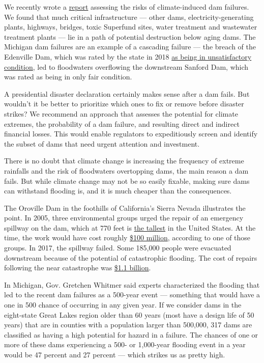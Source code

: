 We recently wrote a
\href{http://water.columbia.edu/files/2020/05/GRI_Report.pdf}{report}
assessing the risks of climate-induced dam failures. We found that much
critical infrastructure --- other dams, electricity-generating plants,
highways, bridges, toxic Superfund sites, water treatment and wastewater
treatment plants --- lie in a path of potential destruction below aging
dams. The Michigan dam failures are an example of a cascading failure
--- the breach of the Edenville Dam, which was rated by the state in
2018
\href{https://www.nytimes3xbfgragh.onion/aponline/2020/05/20/us/ap-us-midwest-flooding.html}{as
being in unsatisfactory condition}, led to floodwaters overflowing the
downstream Sanford Dam, which was rated as being in only fair condition.

A presidential disaster declaration certainly makes sense after a dam
fails. But wouldn't it be better to prioritize which ones to fix or
remove before disaster strikes? We recommend an approach that assesses
the potential for climate extremes, the probability of a dam failure,
and resulting direct and indirect financial losses. This would enable
regulators to expeditiously screen and identify the subset of dams that
need urgent attention and investment.

There is no doubt that climate change is increasing the frequency of
extreme rainfalls and the risk of floodwaters overtopping dams, the main
reason a dam fails. But while climate change may not be so easily
fixable, making sure dams can withstand flooding is, and it is much
cheaper than the consequences.

The Oroville Dam in the foothills of California's Sierra Nevada
illustrates the point. In 2005, three environmental groups urged the
repair of an emergency spillway on the dam, which at 770 feet is
\href{https://www.worldatlas.com/articles/tallest-dams-in-the-united-states.html}{the
tallest} in the United States. At the time, the work would have cost
roughly
\href{https://www.washingtonpost.com/news/post-nation/wp/2017/02/13/officials-were-warned-the-oroville-dam-emergency-spillway-wasnt-safe-they-didnt-listen/}{\$100
million}, according to one of those groups. In 2017, the spillway
failed. Some 185,000 people were evacuated downstream because of the
potential of catastrophic flooding. The cost of repairs following the
near catastrophe was
\href{https://www.latimes.com/local/california/la-me-oroville-cost-20180905-story.html}{\$1.1
billion}.

In Michigan, Gov. Gretchen Whitmer said experts characterized the
flooding that led to the recent dam failures as a 500-year event ---
something that would have a one in 500 chance of occurring in any given
year. If we consider dams in the eight-state Great Lakes region older
than 60 years (most have a design life of 50 years) that are in counties
with a population larger than 500,000, 317 dams are classified as having
a high potential for hazard in a failure. The chances of one or more of
these dams experiencing a 500- or 1,000-year flooding event in a year
would be 47 percent and 27 percent --- which strikes us as pretty high.

